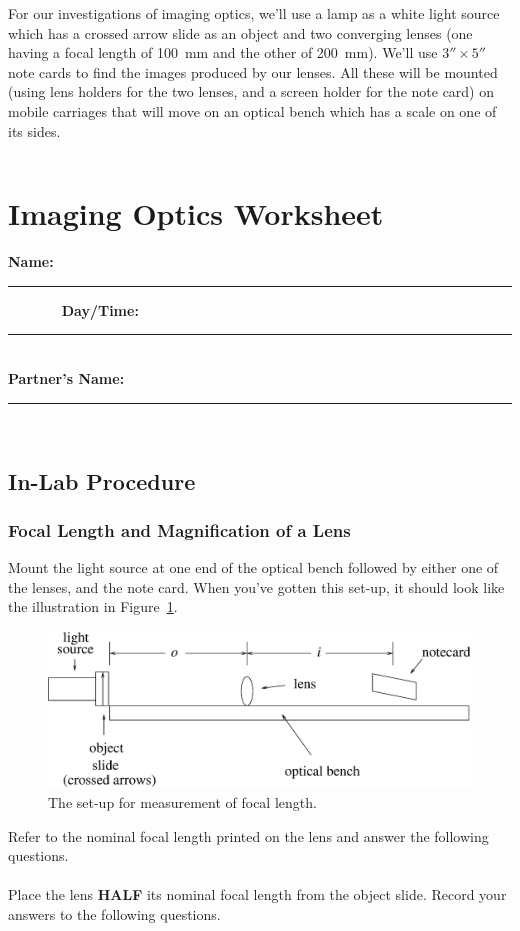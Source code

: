 For our investigations of imaging optics, we'll use a lamp as a white light 
source which has a crossed arrow slide as an object and two converging lenses 
(one having a focal length of 100~mm and the other of 200~mm).  We'll use
$3''\times 5''$ note cards to find the images produced by our lenses.  All these
will be mounted (using lens holders for the two lenses, and a screen holder for
the note card)  on mobile carriages that will move on an optical bench which
has a scale on one of its sides. 

\vfill
\pagebreak
$$
$$
\vfill
\clearpage
\newpage


\renewcommand{\thesection}{\thechapter.W}


\section{Imaging Optics Worksheet}
{\bf \Large Name:}~ \rule{5cm}{.1mm}~~~~~~~
{\bf \Large Day/Time:}~\rule{3cm}{.1mm}\\
{\bf \Large Partner's Name:}~\rule{6cm}{.1mm}\\
\subsection{In-Lab Procedure}
\subsubsection{Focal Length and Magnification of a Lens}

Mount the light source 
at one end of the optical bench followed by
either one 
of the lenses, and the note card.   When you've gotten 
this set-up, it should look like the illustration in 
Figure~\ref{fig:opt:focalsetup}.
\begin{figure}[htb]
\centering 
\epsfxsize=14cm \includegraphics[scale=0.6]{9_imaging/focalsetup.eps}
\caption{The set-up for measurement of focal length.}
\label{fig:opt:focalsetup}
\end{figure}
Refer to the nominal focal length printed on the lens and answer the following questions.  \\
\ \\ 
Place the lens {\bf HALF} its nominal focal length from the object slide. 
Record your answers to the following questions.
\vspace*{.5cm}

